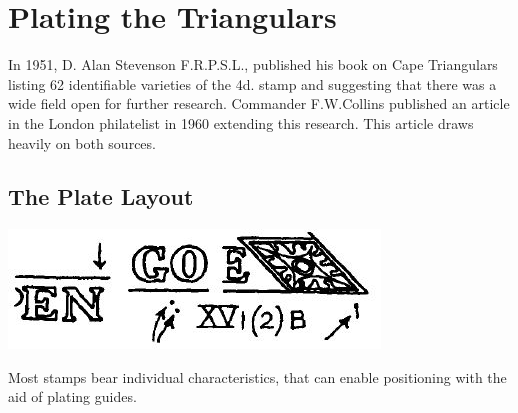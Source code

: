 \chapter{Plating the Triangulars}  

In 1951, D. Alan Stevenson F.R.P.S.L., published his book on Cape Triangulars listing 62 identifiable varieties of the 4d. stamp and suggesting that there was a wide field open for further research. Commander F.W.Collins published an article in the London philatelist in 1960 extending this research. This article draws heavily on both sources.

\section{The Plate Layout}



\begin{marginfigure}
\includegraphics[width = .90\textwidth]{../cape-of-good-hope/4d-identification-example.jpg}
\caption{Most stamps bear individual characteristics, that can enable positioning with the aid of plating guides.}
\end{marginfigure}
\lorem 


